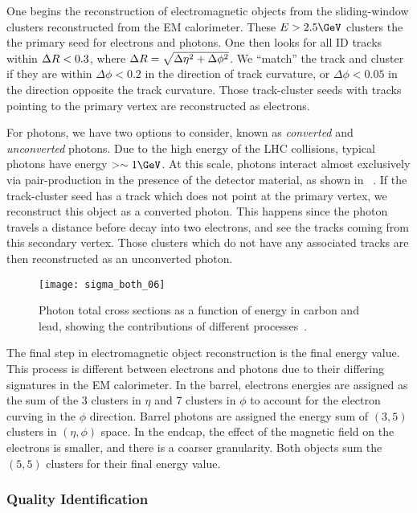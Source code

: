 One begins the reconstruction of electromagnetic objects from the sliding-window clusters reconstructed from the EM calorimeter.
These $E > 2.5 \GeV$ clusters the the primary seed for electrons and photons.
One then looks for all ID tracks within $\Delta R < 0.3$, where $\Delta R = \sqrt{\Delta\eta^2 + \Delta\phi^2}$.
We ``match'' the track and cluster if they are within $\Delta \phi < 0.2$ in the direction of track curvature, or $\Delta \phi < 0.05$ in the direction opposite the track curvature.
Those track-cluster seeds with tracks pointing to the primary vertex are reconstructed as electrons.

For photons, we have two options to consider, known as \textit{converted} and \textit{unconverted} photons.
Due to the high energy of the LHC collisions, typical photons have energy $ >\order 1 \GeV$.
At this scale, photons interact almost exclusively via pair-production in the presence of the detector material, as shown in  ~\cite{Agashe:2014kda}.
If the track-cluster seed has a track which does not point at the primary vertex, we reconstruct this object as a converted photon.
This happens since the photon travels a distance before decay into two electrons, and see the tracks coming from this secondary vertex.
Those clusters which do not have any associated tracks are then reconstructed as an unconverted photon.
\begin{figure}
\caption{Photon total cross sections as a function of energy in carbon and lead, showing the contributions of different processes~\cite{Agashe:2014kda}.} \label{fig:photon_pair_production}
\texttt{[image: sigma\_both\_06]}
\end{figure}

The final step in electromagnetic object reconstruction is the final energy value.
This process is different between electrons and photons due to their differing signatures in the EM calorimeter.
In the barrel, electrons energies are assigned as the sum of the 3 clusters in $\eta$ and 7 clusters in $\phi$ to account for the electron curving in the $\phi$ direction.
Barrel photons are assigned the energy sum of $(3,5)$ clusters in $(\eta, \phi)$ space.
In the endcap, the effect of the magnetic field on the electrons is smaller, and there is a coarser granularity.
Both objects sum the $(5,5)$ clusters for their final energy value.

\subsubsection{Quality Identification}

